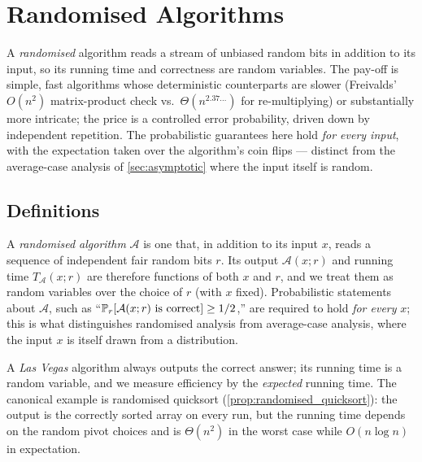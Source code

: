 \section{Randomised Algorithms}
\label{sec:randomised}

A \emph{randomised} algorithm reads a stream of unbiased random bits in addition to its input, so its running time and correctness are random variables. The pay-off is simple, fast algorithms whose deterministic counterparts are slower (Freivalds' $O(n^2)$ matrix-product check vs.\ $\Theta(n^{2.37\dots})$ for re-multiplying) or substantially more intricate; the price is a controlled error probability, driven down by independent repetition. The probabilistic guarantees here hold \emph{for every input}, with the expectation taken over the algorithm's coin flips — distinct from the average-case analysis of \cref{sec:asymptotic} where the input itself is random.

\subsection{Definitions}

\begin{definition}
\label{def:randomised_algorithm}
A \emph{randomised algorithm} $\mathcal{A}$ is one that, in addition to its input $x$, reads a sequence of independent fair random bits $r$. Its output $\mathcal{A}(x; r)$ and running time $T_\mathcal{A}(x; r)$ are therefore functions of both $x$ and $r$, and we treat them as random variables over the choice of $r$ (with $x$ fixed). Probabilistic statements about $\mathcal{A}$, such as ``$\operatorname{\mathbb{P}}_r[\mathcal{A}(x; r) \text{ is correct}] \ge 1/2$,'' are required to hold \emph{for every} $x$; this is what distinguishes randomised analysis from average-case analysis, where the input $x$ is itself drawn from a distribution.
\end{definition}

\begin{definition}
\label{def:las_vegas}
A \emph{Las Vegas} algorithm always outputs the correct answer; its running time is a random variable, and we measure efficiency by the \emph{expected} running time. The canonical example is randomised quicksort (\cref{prop:randomised_quicksort}): the output is the correctly sorted array on every run, but the running time depends on the random pivot choices and is $\Theta(n^2)$ in the worst case while $O(n \log n)$ in expectation.
\end{definition}

